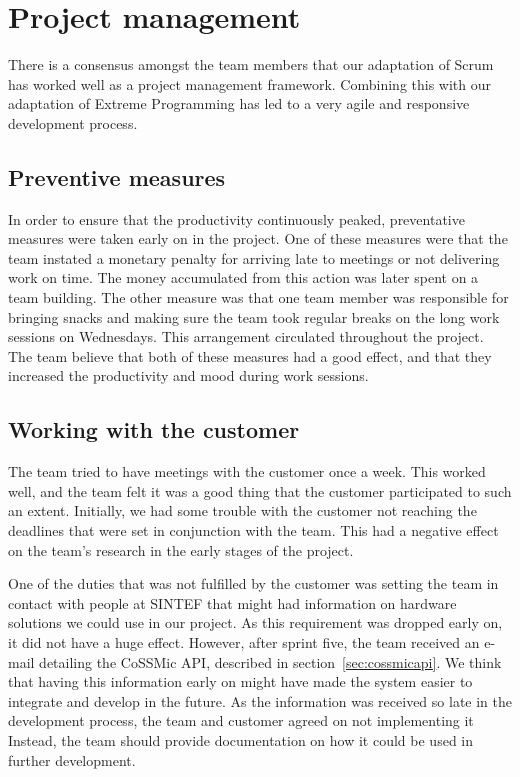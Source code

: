 \section{Project management}
There is a consensus amongst the team members that our adaptation of Scrum has worked well as a project management framework. Combining this with our adaptation of Extreme Programming has led to a very agile and responsive development process. 

\subsection{Preventive measures}
In order to ensure that the productivity continuously peaked, preventative measures were taken early on in the project. One of these measures were that the team instated a monetary penalty for arriving late to meetings or not delivering work on time. The money accumulated from this action was later spent on a team building. The other measure was that one team member was responsible for bringing snacks and making sure the team took regular breaks on the long work sessions on Wednesdays. This arrangement circulated throughout the project. The team believe that both of these measures had a good effect, and that they increased the productivity and mood during work sessions.

\subsection{Working with the customer}
 The team tried to have meetings with the customer once a week. This worked well, and the team felt it was a good thing that the customer participated to such an extent. Initially, we had some trouble with the customer not reaching the deadlines that were set in conjunction with the team. This had a negative effect on the team's research in the early stages of the project. 

One of the duties that was not fulfilled by the customer was setting the team in contact with people at SINTEF that might had information on hardware solutions we could use in our project. As this requirement was dropped early on, it did not have a huge effect. However, after sprint five, the team received an e-mail detailing the CoSSMic API, described in section~\ref{sec:cossmicapi}. We think that having this information early on might have made the system easier to integrate and develop in the future. As the information was received so late in the development process, the team and customer agreed on not implementing it Instead, the team should provide documentation on how it could be used in further development.

